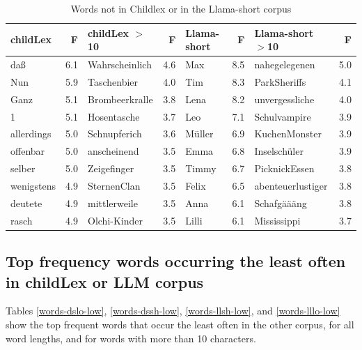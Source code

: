 \documentclass[doc, a4paper, anonymous]{apa7}
\begin{document}
\begin{table}[!htbp]
\caption{Words not in Childlex or in the Llama-short corpus}
\centering
\begin{tabular}{lrlrlrlr}
  \hline
childLex & F & childLex $>$10 & F & Llama-short & F & Llama-short $>$10 & F \\ 
  \hline
daß & 6.1 & Wahrscheinlich & 4.6 & Max & 8.5 & nahegelegenen & 5.0 \\ 
  Nun & 5.9 & Taschenbier & 4.0 & Tim & 8.3 & ParkSheriffs & 4.1 \\ 
  Ganz & 5.1 & Brombeerkralle & 3.8 & Lena & 8.2 & unvergessliche & 4.0 \\ 
  1 & 5.1 & Hosentasche & 3.7 & Leo & 7.1 & Schulvampire & 3.9 \\ 
  allerdings & 5.0 & Schnupferich & 3.6 & Müller & 6.9 & KuchenMonster & 3.9 \\ 
  offenbar & 5.0 & anscheinend & 3.5 & Emma & 6.8 & Inselschüler & 3.9 \\ 
  selber & 5.0 & Zeigefinger & 3.5 & Timmy & 6.7 & PicknickEssen & 3.8 \\ 
  wenigstens & 4.9 & SternenClan & 3.5 & Felix & 6.5 & abenteuerlustiger & 3.8 \\ 
  deutete & 4.9 & mittlerweile & 3.5 & Anna & 6.1 & Schafgäääng & 3.8 \\ 
  rasch & 4.9 & Olchi-Kinder & 3.5 & Lilli & 6.1 & Mississippi & 3.7 \\ 
   \hline
\end{tabular}
\label{words-llsh}
\end{table}

\clearpage




\subsection{Top frequency words occurring the least often in childLex or LLM corpus}

Tables \ref{words-dslo-low}, \ref{words-dssh-low}, \ref{words-llsh-low}, and \ref{words-lllo-low} show the top frequent words that occur the least often in the other corpus, for all word lengths, and for words with more than 10 characters.
\end{document}

